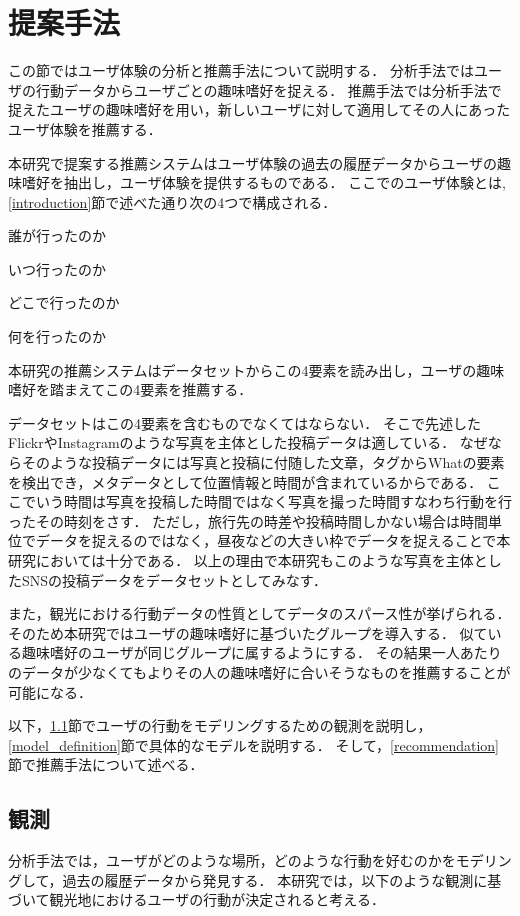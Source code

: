 \documentclass[a4j,10pt, twocolumn]{jarticle}
\begin{document}
\section{提案手法} \label{proposed_method}
この節ではユーザ体験の分析と推薦手法について説明する．
分析手法ではユーザの行動データからユーザごとの趣味嗜好を捉える．
推薦手法では分析手法で捉えたユーザの趣味嗜好を用い，新しいユーザに対して適用してその人にあったユーザ体験を推薦する．

本研究で提案する推薦システムはユーザ体験の過去の履歴データからユーザの趣味嗜好を抽出し，ユーザ体験を提供するものである．
ここでのユーザ体験とは, \ref{introduction}節で述べた通り次の4つで構成される．
\begin{description}
  \setlength{\leftskip}{.5cm}
  \item[\textbf{Who}] 誰が行ったのか
  \item[\textbf{When}] いつ行ったのか
  \item[\textbf{Where}] どこで行ったのか
  \item[\textbf{What}] 何を行ったのか
\end{description}
本研究の推薦システムはデータセットからこの4要素を読み出し，ユーザの趣味嗜好を踏まえてこの4要素を推薦する．

データセットはこの4要素を含むものでなくてはならない．
そこで先述したFlickrやInstagramのような写真を主体とした投稿データは適している．
なぜならそのような投稿データには写真と投稿に付随した文章，タグからWhatの要素を検出でき，メタデータとして位置情報と時間が含まれているからである．
ここでいう時間は写真を投稿した時間ではなく写真を撮った時間すなわち行動を行ったその時刻をさす．
ただし，旅行先の時差や投稿時間しかない場合は時間単位でデータを捉えるのではなく，昼夜などの大きい枠でデータを捉えることで本研究においては十分である．
以上の理由で本研究もこのような写真を主体としたSNSの投稿データをデータセットとしてみなす．

また，観光における行動データの性質としてデータのスパース性が挙げられる．
そのため本研究ではユーザの趣味嗜好に基づいたグループを導入する．
似ている趣味嗜好のユーザが同じグループに属するようにする．
その結果一人あたりのデータが少なくてもよりその人の趣味嗜好に合いそうなものを推薦することが可能になる．

以下，\ref{intuition}節でユーザの行動をモデリングするための観測を説明し，\ref{model_definition}節で具体的なモデルを説明する．
そして，\ref{recommendation}節で推薦手法について述べる．

\subsection{観測} \label{intuition}
分析手法では，ユーザがどのような場所，どのような行動を好むのかをモデリングして，過去の履歴データから発見する．
本研究では，以下のような観測に基づいて観光地におけるユーザの行動が決定されると考える．
\end{document}
